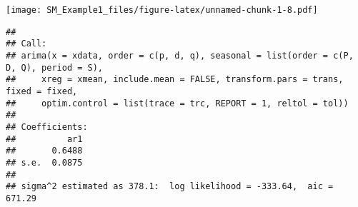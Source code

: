 \documentclass[
]{article}
\newenvironment{Shaded}{\begin{snugshade}}{\end{snugshade}}
\newcommand{\CommentTok}[1]{\textcolor[rgb]{0.56,0.35,0.01}{\textit{#1}}}
\newcommand{\NormalTok}[1]{#1}
\newcommand{\SpecialCharTok}[1]{\textcolor[rgb]{0.00,0.00,0.00}{#1}}
\begin{document}
\texttt{[image: SM\_Example1\_files/figure-latex/unnamed-chunk-1-8.pdf]}

\begin{Shaded}
\end{Shaded}

\begin{verbatim}
## 
## Call:
## arima(x = xdata, order = c(p, d, q), seasonal = list(order = c(P, D, Q), period = S), 
##     xreg = xmean, include.mean = FALSE, transform.pars = trans, fixed = fixed, 
##     optim.control = list(trace = trc, REPORT = 1, reltol = tol))
## 
## Coefficients:
##          ar1
##       0.6488
## s.e.  0.0875
## 
## sigma^2 estimated as 378.1:  log likelihood = -333.64,  aic = 671.29
\end{verbatim}
\end{document}
